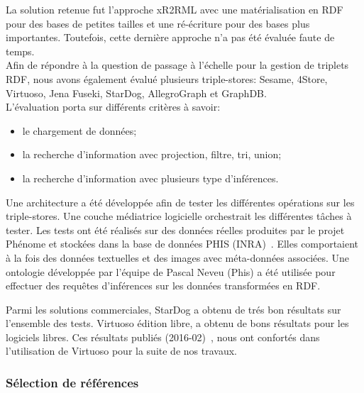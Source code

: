 La solution retenue fut l'approche xR2RML avec une matérialisation en RDF pour des bases de petites tailles et une ré-écriture pour des bases plus importantes. Toutefois, cette dernière approche n'a pas été évaluée faute de temps. \\

Afin de répondre à la question de passage à l'échelle pour la gestion de triplets RDF, nous avons également évalué plusieurs triple-stores: Sesame, 4Store, Virtuoso, Jena Fuseki, StarDog, AllegroGraph et GraphDB.\\
L'évaluation porta sur différents critères à savoir:
\begin{itemize}
\item le chargement de données; 
\item la recherche d'information avec projection, filtre, tri, union;
\item la recherche d'information avec plusieurs type d'inférences.\\
\end{itemize}


Une architecture a été développée afin de tester les différentes opérations sur les triple-stores. Une couche médiatrice logicielle orchestrait les différentes tâches à tester. Les tests ont été réalisés sur des données réelles produites par le projet Phénome et stockées dans la base de données PHIS (INRA)~\cite{neveu2018}. Elles comportaient à la fois des données textuelles et des images avec méta-données associées.  Une ontologie développée par l'équipe de Pascal Neveu (Phis) a été utilisée pour effectuer des requêtes d'inférences sur les données transformées en RDF.


Parmi les solutions commerciales, StarDog a obtenu de trés bon résultats sur l'ensemble des tests. Virtuoso édition libre, a obtenu de bons résultats pour les logiciels libres. Ces résultats publiés (2016-02)~\cite{Luyen:2016}, nous ont confortés dans l'utilisation de Virtuoso pour la suite de nos travaux.

\subsubsection*{Sélection de références}

